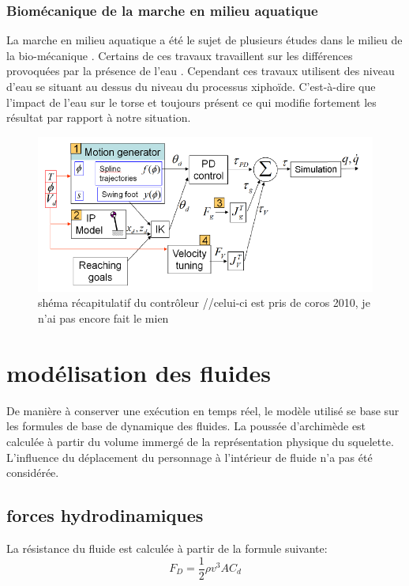\documentclass{llncs}
\begin{document}
	\subsubsection{Biomécanique de la marche en milieu aquatique}
	La marche en milieu aquatique a été le sujet de plusieurs études dans le milieu de la bio-mécanique \cite{barela2006biomechanical,chevutschi2009comparison,orselli2011joint,miyoshi2005functional}.  Certains de ces travaux travaillent sur les différences provoquées par la présence de l'eau \cite{barela2006biomechanical}. Cependant ces travaux utilisent des niveau d'eau se situant au dessus du niveau du processus xiphoïde. C’est-à-dire que l'impact de l'eau sur le torse et toujours présent ce qui modifie fortement les résultat par rapport à notre situation.
	


\begin{figure}[h]
    \centering
    \includegraphics[scale=0.5]{system_overview.png}
    \caption{shéma récapitulatif du contrôleur //celui-ci est pris de coros 2010, je n'ai pas encore fait le mien}
    \label{fig:shema_controler}
\end{figure}

%
\section{modélisation des fluides}
%
De manière à conserver une exécution en temps réel, le modèle utilisé se base sur les formules de base de dynamique des fluides. La poussée d'archimède est calculée à partir du volume immergé de la représentation physique du squelette. L'influence du déplacement du personnage à l'intérieur de fluide n'a pas été considérée.
%
\subsection{forces hydrodinamiques}
%
La résistance du fluide est calculée à partir de la formule suivante:
\[
F_D=\frac{1}{2} \rho v^3 AC_d
\]
\end{document}
